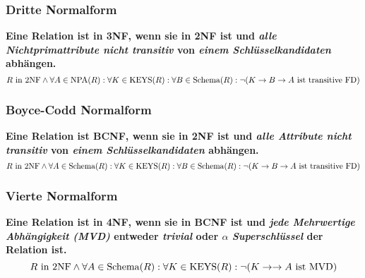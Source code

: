 			\subsubsection{Dritte Normalform} %
				\textbf{Eine Relation ist in 3NF, wenn sie in 2NF ist und \textit{alle Nichtprimattribute nicht transitiv} von \textit{einem Schlüsselkandidaten} abhängen.}
				\begin{equation*}
					R \text{ in 2NF} \land \forall A \in \text{NPA}(R) : \forall K \in \operatorname{KEYS}(R) : \forall B \in \operatorname{Schema}(R) : \lnot(K \rightarrow B \rightarrow A \text{ ist transitive FD})
				\end{equation*}


			\subsubsection{Boyce-Codd Normalform} %
				\textbf{Eine Relation ist BCNF, wenn sie in 2NF ist und \textit{alle Attribute nicht transitiv} von \textit{einem Schlüsselkandidaten} abhängen.}
				\begin{equation*}
					R \text{ in 2NF} \land \forall A \in \operatorname{Schema}(R) : \forall K \in \operatorname{KEYS}(R) : \forall B \in \operatorname{Schema}(R) : \lnot(K \rightarrow B \rightarrow A \text{ ist transitive FD})
				\end{equation*}


			\subsubsection{Vierte Normalform} %
				\textbf{Eine Relation ist in 4NF, wenn sie in BCNF ist und \textit{jede Mehrwertige Abhängigkeit (MVD)} entweder \textit{trivial} oder \(\alpha\) \textit{Superschlüssel} der Relation ist.}
				\begin{equation*}
					R \text{ in 2NF} \land \forall A \in \operatorname{Schema}(R) : \forall K \in \operatorname{KEYS}(R) : \lnot(K \rightarrow \rightarrow A \text{ ist MVD})
				\end{equation*}

